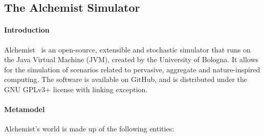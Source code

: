 \subsection{The Alchemist Simulator}
\label{ssec:the-alchemist-simulator}
\paragraph{Introduction} Alchemist~\cite{alchemist} is an open-source, extensible and stochastic simulator that runs on the Java Virtual Machine (JVM), created by the University of Bologna. It allows for the simulation of scenarios related to pervasive, aggregate and nature-inspired computing. The software is available on GitHub, and is distributed under the GNU GPLv3+ license with linking exception.

\paragraph{Metamodel} Alchemist's world is made up of the following entities:
